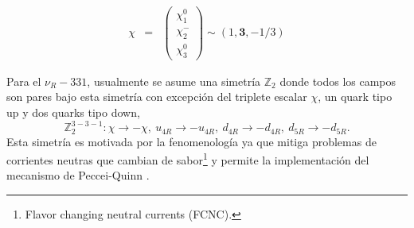 \begin{eqnarray}
\chi &=& \left( \begin{array}{c}
\chi_1^0 \\ \chi_2^-  \\ \chi_3^0
\end{array} \right) \sim (1, \textbf{3}, -1/3)
\end{eqnarray}

Para el $\nu_R-331$, usualmente se asume una simetría $\mathbb{Z}_2$ donde todos los campos son pares bajo esta simetría con excepción del triplete escalar $\chi$, un quark tipo up y dos quarks tipo down,
\begin{equation}
\mathbb{Z}_2^{3-3-1} : \chi \to - \chi, \ u_{4R} \to - u_{4R}, \ d_{4R} \to - d_{4R}, \ d_{5R} \to - d_{5R}.
\end{equation}
Esta simetría es motivada por la fenomenología ya que mitiga problemas de corrientes neutras que cambian de sabor\footnote{Flavor changing neutral currents (FCNC).} \cite{GomezDumm:1993oxo} y permite la implementación del mecanismo de Peccei-Quinn \cite{Montero:2011tg}.


